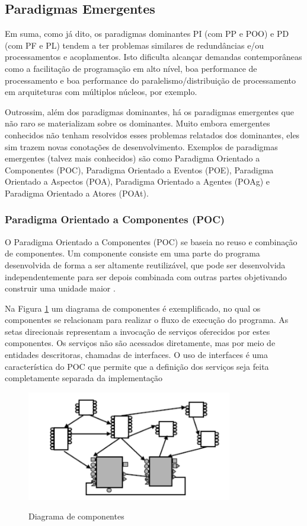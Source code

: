 \subsection{Paradigmas Emergentes}

Em suma, como já dito, os paradigmas dominantes PI (com PP e POO) e PD (com PF e
PL) tendem a ter problemas similares de redundâncias e/ou processamentos e
acoplamentos. Isto dificulta alcançar demandas contemporâneas como a facilitação
de programação em alto nível, boa performance de processamento e boa performance
do paralelismo/distribuição de processamento em arquiteturas com múltiplos
núcleos, por exemplo. 

Outrossim, além dos paradigmas dominantes, há os paradigmas emergentes que não
raro se materializam sobre os dominantes. Muito embora emergentes conhecidos não
tenham resolvidos esses problemas relatados dos dominantes, eles sim trazem
novas conotações de desenvolvimento. Exemplos de paradigmas emergentes (talvez
mais conhecidos) são como Paradigma Orientado a Componentes (POC), Paradigma
Orientado a Eventos (POE), Paradigma Orientado a Aspectos (POA), Paradigma
Orientado a Agentes (POAg) e Paradigma Orientado a Atores (POAt).


\subsubsection{Paradigma Orientado a Componentes (POC)}

O Paradigma Orientado a Componentes (POC) se baseia no reuso e combinação de
componentes. Um componente consiste em uma parte do programa desenvolvida de
forma a ser altamente reutilizável, que pode ser desenvolvida independentemente
para ser depois combinada com outras partes objetivando construir uma unidade
maior \cite{dsouza_1998}.

Na Figura \ref{fig:componentes} um diagrama de componentes é exemplificado, no
qual os componentes se relacionam para realizar o fluxo de execução do programa.
As setas direcionais representam a invocação de serviços oferecidos por estes
componentes. Os serviços não são acessados diretamente, mas por meio de
entidades descritoras, chamadas de interfaces. O uso de interfaces é uma
característica do POC que permite que a definição dos serviços seja feita
completamente separada da implementação \cite{crnkovic_2002}

\begin{figure}[!htb]
  \centering
  \caption{Diagrama de componentes}
  \includegraphics[width=0.8\textwidth]{../figures/componentes.png}
  \label{fig:componentes}
\end{figure}


